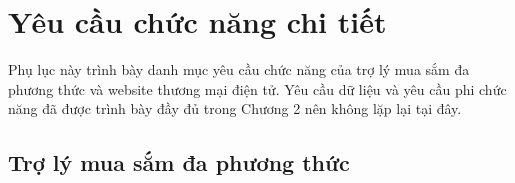 \section{Yêu cầu chức năng chi tiết}
\label{functional-requirements-detail}

Phụ lục này trình bày danh mục yêu cầu chức năng của trợ lý mua sắm đa phương
thức và website thương mại điện tử. Yêu cầu dữ liệu và yêu cầu phi chức năng đã
được trình bày đầy đủ trong Chương 2 nên không lặp lại tại đây.

\subsection{Trợ lý mua sắm đa phương thức}

